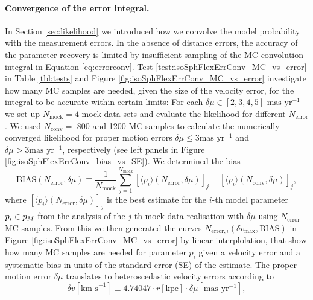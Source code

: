 \paragraph{Convergence of the error integral.}  In Section \ref{sec:likelihood} we introduced how we convolve the model probability with the measurement errors. In the absence of distance errors, the accuracy of the parameter recovery is limited by insufficient sampling of the MC convolution integral in Equation \ref{eq:errorconv}. Test \ref{test:isoSphFlexErrConv_MC_vs_error} in Table \ref{tbl:tests} and Figure \ref{fig:isoSphFlexErrConv_MC_vs_error} investigate how many MC samples are needed, given the size of the velocity error, for the integral to be accurate within certain limits: For each $\delta \mu \in [2,3,4,5] \text{ mas yr}^{-1}$ we set up $N_\text{mock} = 4$ mock data sets and evaluate the likelihood for different $N_\text{error}$. We used $N_\text{conv} =$ 800 and 1200 MC samples to calculate the numerically converged likelihood for proper motion errors $\delta \mu \leq 3 \text{mas yr}^{-1}$ and $\delta \mu > 3 \text{mas yr}^{-1}$, respectively (see left panels in Figure \ref{fig:isoSphFlexErrConv_bias_vs_SE}). We determined the bias 
\begin{equation*}
\text{BIAS}(N_\text{error},\delta \mu) \equiv \frac{1}{N_\text{mock}} \sum_{j=1}^{N_\text{mock}} \left[ \langle p_i \rangle (N_\text{error},\delta \mu)\right]_j - \left[ \langle p_i \rangle (N_\text{conv},\delta \mu)\right]_j,
\end{equation*}
where $\left[ \langle p_i \rangle (N_\text{error},\delta \mu)\right]_j$ is the best estimate for the $i$-th model parameter $p_i \in p_M$ from the analysis of the $j$-th mock data realisation with $\delta \mu$ using $N_\text{error}$ MC samples. From this we then generated the curves $N_{\text{error},i} (\delta v_\text{max},\text{BIAS})$ in Figure \ref{fig:isoSphFlexErrConv_MC_vs_error} by linear interplolation, that show how many MC samples are needed for parameter $p_i$ given a velocity error and a systematic bias in units of the standard error (SE) of the estimate. The proper motion error $\delta \mu$ translates to heteroscedastic  velocity errors according to
\begin{equation}
\delta v [\text{km s}^{-1}] \equiv 4.74047 \cdot r[\text{kpc}] \cdot \delta \mu [\text{mas yr}^{-1}], \label{eq:vmax}
\end{equation}

